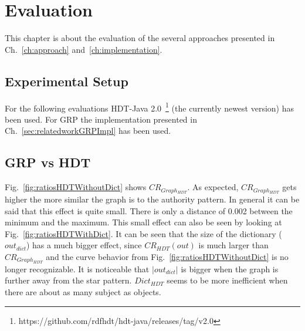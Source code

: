 \chapter{Evaluation}\label{ch:evaluation}

This chapter is about the evaluation of the several approaches presented in Ch.~\ref{ch:approach} and~\ref{ch:implementation}.

\section{Experimental Setup}

For the following evaluations HDT-Java 2.0~\footnote{\label{foot:1}https://github.com/rdfhdt/hdt-java/releases/tag/v2.0} (the currently newest version) has been used. For GRP the implementation presented in Ch.~\ref{sec:relatedworkGRPImpl} has been used.

\section{GRP vs HDT}\label{sec:evaluationHDTvsGRP}


Fig.~\ref{fig:ratiosHDTWithoutDict} shows $CR_{Graph_{HDT}}$. As expected, $CR_{Graph_{HDT}}$ gets higher the more similar the graph is to the authority pattern. In general it can be said that this effect is quite small. There is only a distance of 0.002 between the minimum and the maximum. This small effect can also be seen by looking at Fig.~\ref{fig:ratiosHDTWithDict}. It can be seen that the size of the dictionary ($out_{dict}$) has a much bigger effect, since $CR_{HDT}(out)$ is much larger than $CR_{Graph_{HDT}}$ and the curve behavior from Fig.~\ref{fig:ratiosHDTWithoutDict} is no longer recognizable. It is noticeable that $|out_{dict}|$ is bigger when the graph is further away from the star pattern. $Dict_{HDT}$ seems to be more inefficient when there are about as many subject as objects. 

